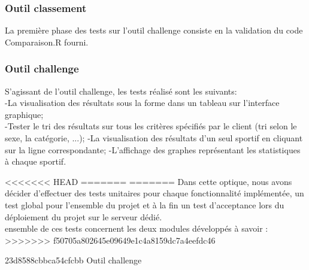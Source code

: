 \subsubsection{Outil classement}
La première phase  des tests sur l'outil challenge consiste en la validation du code  Comparaison.R fourni.

\subsubsection{Outil challenge}
S'agissant de l'outil challenge, les tests réalisé sont les suivants:\\
-La visualisation des résultats sous la forme dans un tableau sur l'interface graphique; \\
-Tester le tri des résultats sur tous les critères spécifiés par le  client (tri selon le sexe, la catégorie, ...);
-La visualisation des résultats d'un seul sportif en cliquant sur la ligne correspondante;
-L'affichage des graphes représentant les statistiques à chaque sportif.

 

<<<<<<< HEAD
=======
=======
Dans cette optique, nous avons décider d'effectuer des tests unitaires pour chaque fonctionnalité implémentée, un test global pour l'ensemble du projet et à la fin un test d'acceptance lors du déploiement du projet sur le serveur dédié.\\
                                                                                                                                                                                                                                                ensemble de ces tests concernent les deux modules développés à savoir :
>>>>>>> f50705a802645e09649e1c4a8159dc7a4eefdc46


23d8588cbbca54cfcbb
{Outil challenge}

